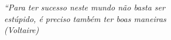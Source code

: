 \begin{epigrafe}
    \vspace*{\fill}
	\begin{flushright}
		\textit{``Para ter sucesso neste mundo não basta ser \\
		estúpido, é preciso também ter boas maneiras\\
		(Voltaire)}
	\end{flushright}
\end{epigrafe}
